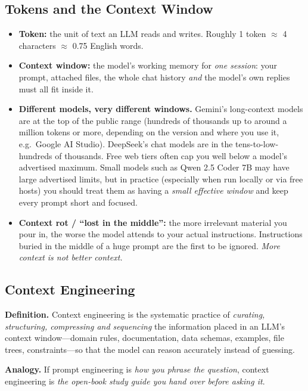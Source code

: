 \documentclass[11pt,a4paper]{article}
\begin{document}
\subsection{Tokens and the Context Window}
\begin{itemize}
\item \textbf{Token:} the unit of text an LLM reads and writes. Roughly 1 token $\approx$ 4 characters $\approx$ 0.75 English words.
\item \textbf{Context window:} the model's working memory for \emph{one session}: your prompt, attached files, the whole chat history \emph{and} the model's own replies must all fit inside it.
\item \textbf{Different models, very different windows.} Gemini's long-context models are at the top of the public range (hundreds of thousands up to around a million tokens or more, depending on the version and where you use it, e.g.\ Google AI Studio). DeepSeek's chat models are in the tens-to-low-hundreds of thousands. Free web tiers often cap you well below a model's advertised maximum. Small models such as Qwen 2.5 Coder 7B may have large advertised limits, but in practice (especially when run locally or via free hosts) you should treat them as having a \emph{small effective window} and keep every prompt short and focused.
\item \textbf{Context rot / ``lost in the middle'':} the more irrelevant material you pour in, the worse the model attends to your actual instructions. Instructions buried in the middle of a huge prompt are the first to be ignored. \emph{More context is not better context.}
\end{itemize}

\subsection{Context Engineering}
\begin{tcolorbox}[colback=white,colframe=accent,boxrule=0.6pt,arc=2pt]
\textbf{Definition.} Context engineering is the systematic practice of \emph{curating, structuring, compressing and sequencing} the information placed in an LLM's context window---domain rules, documentation, data schemas, examples, file trees, constraints---so that the model can reason accurately instead of guessing.
\end{tcolorbox}

\textbf{Analogy.} If prompt engineering is \emph{how you phrase the question}, context engineering is \emph{the open-book study guide you hand over before asking it}.
\end{document}

